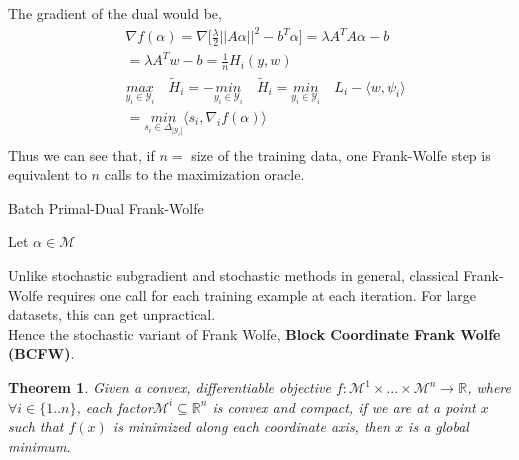 \documentclass{article}
\newtheorem{theorem}{Theorem}
\begin{document}
The gradient of the dual would be, 
\begin{equation*}
\begin{aligned}
    &\nabla f(\alpha)= \nabla\Big[\frac{\lambda}{2}||A\alpha||^{2}- b^{T}\alpha\Big] = \lambda A^{T}A\alpha- b\\
    &= \lambda A^{T}w- b= \frac{1}{n}H_{i}(y,w)\\
    &\underset{y_{i}\in\mathcal{Y}_{i}}{\textit{max}}\quad\tilde{H}_{i}= -\underset{y_{i}\in\mathcal{Y}_{i}}{\textit{min}}\quad\tilde{H}_{i} = \underset{y_{i}\in\mathcal{Y}_{i}}{\textit{min}}\quad L_{i}- \langle w, \psi_{i}\rangle\\
    &= \underset{s_{i}\in\Delta_{|\mathcal{Y}_{i}|}}{\textit{min}}\langle s_{i}, \nabla_{i} f(\alpha)\rangle\\
\end{aligned}
\end{equation*}
Thus we can see that, if $n=$ size of the training data, one Frank-Wolfe step is equivalent to $n$ calls to the maximization oracle.
\begin{algorithm}[tb]
   \caption{Batch Primal-Dual Frank-Wolfe}
   \label{alg:example}
\begin{algorithmic}
   \STATE Let $\alpha\in\mathcal{M}$
    \\
   \ENDFOR
   \ENDFOR
\end{algorithmic}
\end{algorithm}
Unlike stochastic subgradient and stochastic methods in general, classical Frank-Wolfe requires one call for each training example at each iteration. For large datasets, this can get unpractical.\\
Hence the stochastic variant of Frank Wolfe, \textbf{Block Coordinate Frank Wolfe (BCFW)}.
\begin{theorem}
Given a convex, differentiable objective $f:\mathcal{M}^{1}\times...\times\mathcal{M}^{n}\to\mathbb{R}$, where $\forall i\in\{1..n\}$, each factor\quad $\mathcal{M}^{i}\subseteq\mathbb{R}^{n}$ is convex and compact, if we are at a point $x$ such that $f(x)$ is minimized along each coordinate axis, then $x$ is a global minimum. \cite{Tseng01}
\end{theorem}
\end{document}
